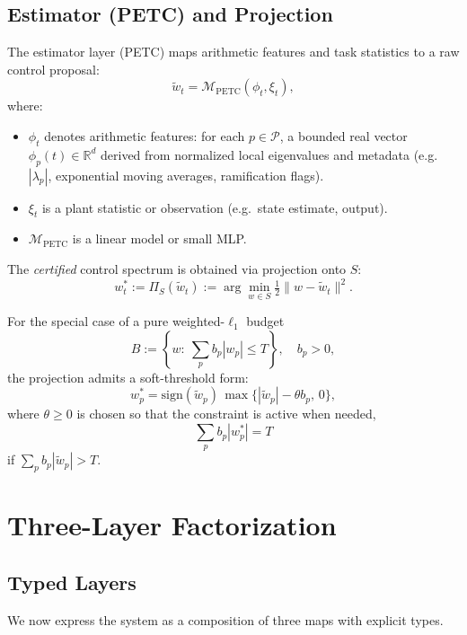 \documentclass[11pt]{article}
\begin{document}
\subsection{Estimator (PETC) and Projection}

The estimator layer (PETC) maps arithmetic features and task statistics to a raw control proposal:
\begin{equation}
  \tilde w_t = \mathcal M_{\mathrm{PETC}}(\phi_t,\xi_t),
\end{equation}
where:
\begin{itemize}
  \item $\phi_t$ denotes arithmetic features: for each $p\in\mathcal P$, a bounded real vector $\phi_p(t)\in\mathbb R^d$ derived from normalized local eigenvalues and metadata (e.g.\ $|\lambda_p|$, exponential moving averages, ramification flags).
  \item $\xi_t$ is a plant statistic or observation (e.g.\ state estimate, output).
  \item $\mathcal M_{\mathrm{PETC}}$ is a linear model or small MLP.
\end{itemize}

The \emph{certified} control spectrum is obtained via projection onto $S$:
\begin{equation}
  w_t^\ast
  := \Pi_S(\tilde w_t)
  := \arg\min_{w\in S} \tfrac12 \|w - \tilde w_t\|^2.
  \label{eq:projection}
\end{equation}

For the special case of a pure weighted-$\ell_1$ budget
\[
B := \left\{w:\ \sum_p b_p |w_p| \le T\right\},\quad b_p>0,
\]
the projection admits a soft-threshold form:
\begin{equation}
  w_p^\ast = \mathrm{sign}(\tilde w_p)\,\max\{|\tilde w_p| - \theta b_p,\,0\},
\end{equation}
where $\theta\ge 0$ is chosen so that the constraint is active when needed,
\[
\sum_p b_p |w_p^\ast| = T
\]
if $\sum_p b_p|\tilde w_p|>T$.

\section{Three-Layer Factorization}

\subsection{Typed Layers}

We now express the system as a composition of three maps with explicit types.
\end{document}
